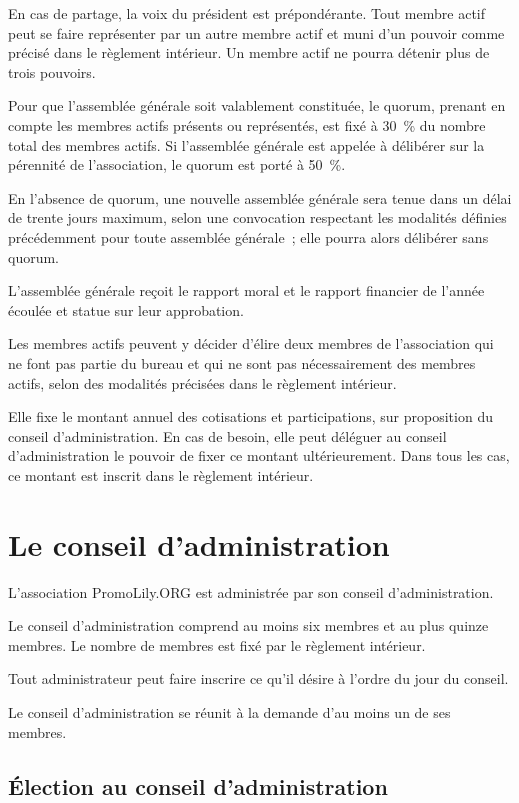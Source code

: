\documentclass[a4wide,12pt]{scrartcl}
\newcommand{\nomAssoc}{PromoLily.ORG\xspace}
\begin{document}
En cas de partage, la voix du président est prépondérante. Tout membre
actif peut se faire représenter par un autre membre actif et muni d'un
pouvoir comme précisé dans le règlement intérieur. Un membre actif ne
pourra détenir plus de trois pouvoirs.

Pour que l'assemblée générale soit valablement constituée, le quorum,
prenant en compte les membres actifs présents ou représentés, est fixé
à 30~\% du nombre total des membres actifs. Si l'assemblée générale est
appelée à délibérer sur la pérennité de l'association, le quorum est porté
à 50~\%.

En l'absence de quorum, une nouvelle assemblée générale sera tenue
dans un délai de trente jours maximum, selon une convocation
respectant les modalités définies précédemment pour toute assemblée
générale~; elle pourra alors délibérer sans quorum.

L'assemblée générale reçoit le rapport moral et le rapport financier
de l'année écoulée et statue sur leur approbation.

Les membres actifs peuvent y décider d'élire deux membres de
l'association qui ne font pas partie du bureau et qui ne sont pas
nécessairement des membres actifs, selon des modalités précisées dans
le règlement intérieur.

Elle fixe le montant annuel des cotisations et participations, sur
proposition du conseil d'administration. En cas de besoin, elle peut
déléguer au conseil d'administration le pouvoir de fixer ce montant
ultérieurement. Dans tous les cas, ce montant est inscrit dans le
règlement intérieur.

\section{Le conseil d'administration}

L'association \nomAssoc est administrée par son conseil
d'administration.

Le conseil d'administration comprend au moins six membres et au plus
quinze membres. Le nombre de membres est fixé par le règlement
intérieur.

Tout administrateur peut faire inscrire ce qu'il désire à l'ordre du
jour du conseil.

Le conseil d’administration se réunit à la demande d’au moins un de
ses membres.

\subsection{Élection au conseil d'administration}
\end{document}

